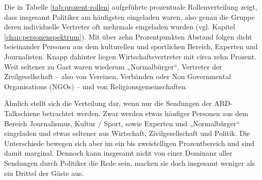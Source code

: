 Die in Tabelle \vref{tab:prozent-rollen} aufgeführte prozentuale Rollenverteilung zeigt, dass insgesamt Politiker am häufigsten eingeladen waren, also genau die Gruppe deren individuelle Vertreter oft mehrmals eingeladen wurden (vgl. Kapitel \vref{chap:personenspektrum}). Mit über zehn Prozentpunkten Abstand folgen dicht beieinander Personen aus dem kulturellen und sportlichen Bereich, Experten und Journalisten. Knapp dahinter liegen Wirtschaftsvertreter mit circa zehn Prozent. Weit seltener zu Gast waren wiederum „Normalbürger“, Vertreter der Zivilgesellschaft – also von Vereinen, Verbänden oder Non Governmental Organisations (NGOs) – und von Religionsgemeinschaften.

Ähnlich stellt sich die Verteilung dar, wenn nur die Sendungen der ARD-Talkschiene betrachtet werden. Zwar werden etwas häufiger Personen aus dem Bereich Journalismus, Kultur / Sport, sowie Experten und „Normalbürger“ eingeladen und etwas seltener aus  Wirtschaft, Zivilgesellschaft und Politik. Die Unterschiede bewegen sich aber im ein bis zweistelligen Prozentbereich und sind damit marginal. Dennoch kann insgesamt nicht von einer Dominanz aller Sendungen durch Politiker die Rede sein, machen sie doch insgesamt weniger als ein Drittel der Gäste aus.

